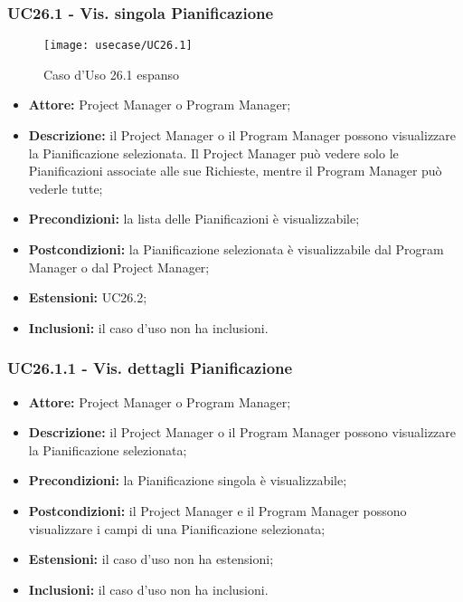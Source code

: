 \subsubsection*{UC26.1 - Vis. singola Pianificazione}
\begin{figure}[H] 
	\centering
    \texttt{[image: usecase/UC26.1]} 
    \caption{Caso d'Uso 26.1 espanso}
\end{figure}

\begin{itemize}[label=$\circ$]
\item \textbf{Attore:}  Project Manager o Program Manager;
\item \textbf{Descrizione:} il Project Manager o il Program Manager possono visualizzare la Pianificazione selezionata. Il Project Manager può vedere solo le Pianificazioni associate alle sue Richieste, mentre il Program Manager può vederle tutte;
\item \textbf{Precondizioni:} la lista delle Pianificazioni è visualizzabile;
\item \textbf{Postcondizioni:} la Pianificazione selezionata è visualizzabile dal Program Manager o dal Project Manager;
\item \textbf{Estensioni:} UC26.2;
\item \textbf{Inclusioni:} il caso d'uso non ha inclusioni.
\end{itemize}

\subsubsection*{UC26.1.1 - Vis. dettagli Pianificazione}
\begin{itemize}[label=$\circ$]
\item \textbf{Attore:}  Project Manager o Program Manager;
\item \textbf{Descrizione:} il Project Manager o il Program Manager possono visualizzare la
Pianificazione selezionata;
\item \textbf{Precondizioni:} la Pianificazione singola è visualizzabile;
\item \textbf{Postcondizioni:} il Project Manager e il Program Manager possono visualizzare
i campi di una Pianificazione selezionata;
\item \textbf{Estensioni:} il caso d'uso non ha estensioni;
\item \textbf{Inclusioni:} il caso d'uso non ha inclusioni.
\end{itemize}


